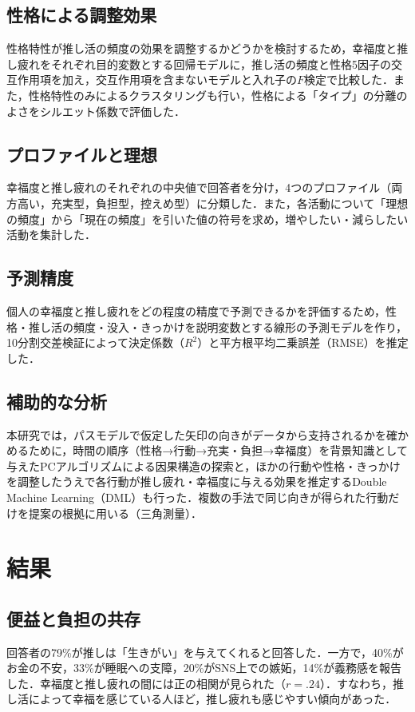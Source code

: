 \subsection{性格による調整効果}
性格特性が推し活の頻度の効果を調整するかどうかを検討するため，幸福度と推し疲れをそれぞれ目的変数とする回帰モデルに，推し活の頻度と性格5因子の交互作用項を加え，交互作用項を含まないモデルと入れ子の$F$検定で比較した．また，性格特性のみによるクラスタリングも行い，性格による「タイプ」の分離のよさをシルエット係数で評価した．

\subsection{プロファイルと理想}
幸福度と推し疲れのそれぞれの中央値で回答者を分け，4つのプロファイル（両方高い，充実型，負担型，控えめ型）に分類した．また，各活動について「理想の頻度」から「現在の頻度」を引いた値の符号を求め，増やしたい・減らしたい活動を集計した．

\subsection{予測精度}
個人の幸福度と推し疲れをどの程度の精度で予測できるかを評価するため，性格・推し活の頻度・没入・きっかけを説明変数とする線形の予測モデルを作り，10分割交差検証によって決定係数（$R^2$）と平方根平均二乗誤差（RMSE）を推定した．

\subsection{補助的な分析}
本研究では，パスモデルで仮定した矢印の向きがデータから支持されるかを確かめるために，時間の順序（性格→行動→充実・負担→幸福度）を背景知識として与えたPCアルゴリズム\cite{spirtes2000}による因果構造の探索と，ほかの行動や性格・きっかけを調整したうえで各行動が推し疲れ・幸福度に与える効果を推定するDouble Machine Learning（DML）\cite{chernozhukov2018}も行った．複数の手法で同じ向きが得られた行動だけを提案の根拠に用いる（三角測量）．

\section{結果}
\subsection{便益と負担の共存}
回答者の79\%が推しは「生きがい」を与えてくれると回答した．一方で，40\%がお金の不安，33\%が睡眠への支障，20\%がSNS上での嫉妬，14\%が義務感を報告した．幸福度と推し疲れの間には正の相関が見られた（$r=.24$）．すなわち，推し活によって幸福を感じている人ほど，推し疲れも感じやすい傾向があった．

